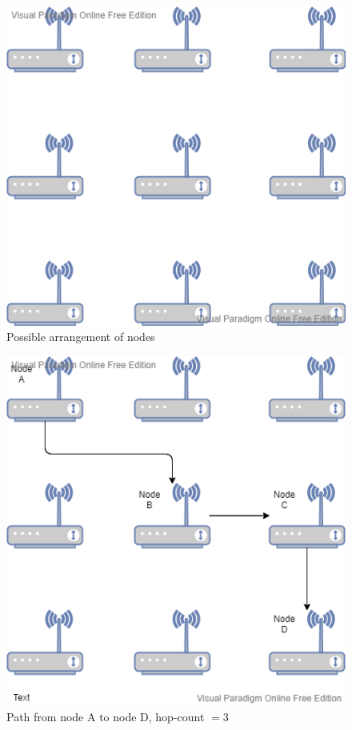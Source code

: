\documentclass[12pt]{report}
\begin{document}
\begin{figure}[h]
\centering
\includegraphics[scale=0.6]{pic1}
\caption{Possible arrangement of nodes}
\label{fig:3}
\end{figure}
\begin{figure}[h]
\centering
\includegraphics[scale=0.6]{pic2}
\caption{Path from node A to node D, hop-count $=3$}
\label{fig:4}
\end{figure}
\end{document}
